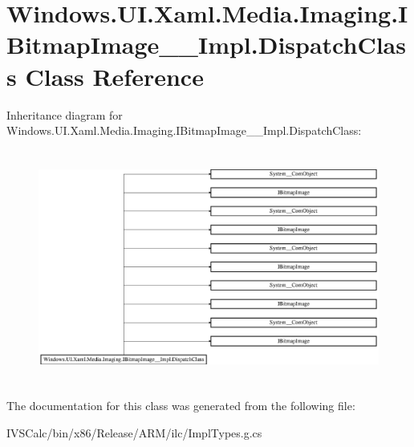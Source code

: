 \hypertarget{class_windows_1_1_u_i_1_1_xaml_1_1_media_1_1_imaging_1_1_i_bitmap_image_____impl_1_1_dispatch_class}{}\section{Windows.\+U\+I.\+Xaml.\+Media.\+Imaging.\+I\+Bitmap\+Image\+\_\+\+\_\+\+Impl.\+Dispatch\+Class Class Reference}
\label{class_windows_1_1_u_i_1_1_xaml_1_1_media_1_1_imaging_1_1_i_bitmap_image_____impl_1_1_dispatch_class}
Inheritance diagram for Windows.\+U\+I.\+Xaml.\+Media.\+Imaging.\+I\+Bitmap\+Image\+\_\+\+\_\+\+Impl.\+Dispatch\+Class\+:\begin{figure}[H]
\begin{center}
\leavevmode
\includegraphics[height=7.700000cm]{class_windows_1_1_u_i_1_1_xaml_1_1_media_1_1_imaging_1_1_i_bitmap_image_____impl_1_1_dispatch_class}
\end{center}
\end{figure}


The documentation for this class was generated from the following file\+:\begin{DoxyCompactItemize}
\item 
I\+V\+S\+Calc/bin/x86/\+Release/\+A\+R\+M/ilc/Impl\+Types.\+g.\+cs\end{DoxyCompactItemize}
